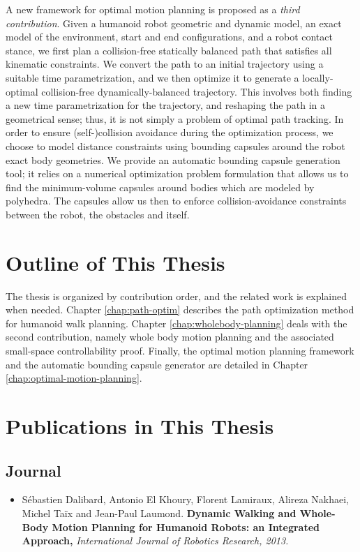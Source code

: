 A new framework for optimal motion planning is proposed as a
\emph{third contribution}. Given a humanoid robot geometric and
dynamic model, an exact model of the environment, start and end
configurations, and a robot contact stance, we first plan a
collision-free statically balanced path that satisfies all kinematic
constraints. We convert the path to an initial trajectory using a
suitable time parametrization, and we then optimize it to generate a
locally-optimal collision-free dynamically-balanced trajectory. This
involves both finding a new time parametrization for the trajectory,
and reshaping the path in a geometrical sense; thus, it is not simply
a problem of optimal path tracking. In order to ensure
(self-)collision avoidance during the optimization process, we choose
to model distance constraints using bounding capsules around the robot
exact body geometries. We provide an automatic bounding capsule
generation tool; it relies on a numerical optimization problem
formulation that allows us to find the minimum-volume capsules around
bodies which are modeled by polyhedra. The capsules allow us then to
enforce collision-avoidance constraints between the robot, the
obstacles and itself.

\section{Outline of This Thesis}

The thesis is organized by contribution order, and the related work is
explained when needed. Chapter \ref{chap:path-optim} describes the
path optimization method for humanoid walk planning. Chapter
\ref{chap:wholebody-planning} deals with the second contribution,
namely whole body motion planning and the associated small-space
controllability proof. Finally, the optimal motion planning framework
and the automatic bounding capsule generator are detailed in Chapter
\ref{chap:optimal-motion-planning}.

\section{Publications in This Thesis}

\subsection*{Journal}

\begin{itemize}
\item S\'ebastien Dalibard, Antonio El Khoury, Florent Lamiraux,
  Alireza Nakhaei, Michel Ta\"ix and Jean-Paul
  Laumond. \textbf{Dynamic Walking and Whole-Body Motion Planning for
    Humanoid Robots: an Integrated Approach,} \textit{International
    Journal of Robotics Research, 2013.}
\end{itemize}

